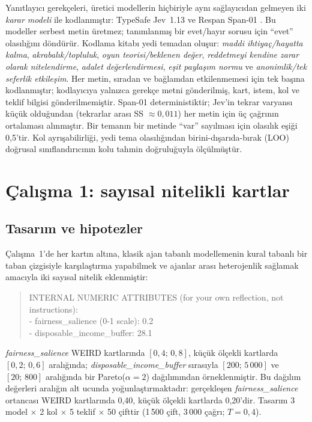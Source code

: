 \documentclass[11pt]{article}
\newcommand{\fairs}{\textit{fairness\_salience}}
\newcommand{\disp}{\textit{disposable\_income\_buffer}}
\begin{document}
Yanıtlayıcı gerekçeleri, üretici modellerin hiçbiriyle aynı sağlayıcıdan gelmeyen iki \emph{karar modeli} ile kodlanmıştır: TypeSafe Jev~1.13 \citep{typesafe2026jev} ve Respan Span-01 \citep{respan2026span}. Bu modeller serbest metin üretmez; tanımlanmış bir evet/hayır sorusu için ``evet'' olasılığını döndürür. Kodlama kitabı yedi temadan oluşur: \emph{maddi ihtiyaç/hayatta kalma}, \emph{akrabalık/topluluk}, \emph{oyun teorisi/beklenen değer}, \emph{reddetmeyi kendine zarar olarak nitelendirme}, \emph{adalet değerlendirmesi}, \emph{eşit paylaşım normu} ve \emph{anonimlik/tek seferlik etkileşim}. Her metin, sıradan ve bağlamdan etkilenmemesi için tek başına kodlanmıştır; kodlayıcıya yalnızca gerekçe metni gönderilmiş, kart, istem, kol ve teklif bilgisi gönderilmemiştir. Span-01 deterministiktir; Jev'in tekrar varyansı küçük olduğundan (tekrarlar arası SS $\approx 0{,}011$) her metin için üç çağrının ortalaması alınmıştır. Bir temanın bir metinde ``var'' sayılması için olasılık eşiği 0,5'tir. Kol ayrışabilirliği, yedi tema olasılığından birini-dışarıda-bırak (LOO) doğrusal sınıflandırıcının kolu tahmin doğruluğuyla ölçülmüştür.


\section{Çalışma 1: sayısal nitelikli kartlar}\label{sec:study1}

\subsection{Tasarım ve hipotezler}

Çalışma~1'de her kartın altına, klasik ajan tabanlı modellemenin kural tabanlı bir taban çizgisiyle karşılaştırma yapabilmek ve ajanlar arası heterojenlik sağlamak amacıyla iki sayısal nitelik eklenmiştir:

\begin{quote}
\ttfamily\small
INTERNAL NUMERIC ATTRIBUTES (for your own reflection, not instructions):\\
- fairness\_salience (0-1 scale): 0.2\\
- disposable\_income\_buffer: 28.1
\end{quote}

\fairs{} WEIRD kartlarında $[0{,}4;\,0{,}8]$, küçük ölçekli kartlarda $[0{,}2;\,0{,}6]$ aralığında; \disp{} sırasıyla $[200;\,5\,000]$ ve $[20;\,800]$ aralığında bir Pareto($\alpha = 2$) dağılımından örneklenmiştir. Bu dağılım değerleri aralığın alt ucunda yoğunlaştırmaktadır: gerçekleşen \fairs{} ortancası WEIRD kartlarında 0,40, küçük ölçekli kartlarda 0,20'dir. Tasarım 3 model $\times$ 2 kol $\times$ 5 teklif $\times$ 50 çifttir (1\,500 çift, 3\,000 çağrı; $T = 0{,}4$).
\end{document}
